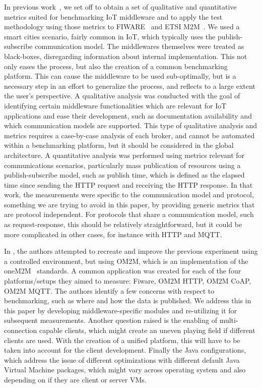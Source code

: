 \documentclass[conference]{IEEEtran}
\begin{document}
In previous work~\cite{cardoso_benchmarking_2017}, we set off to obtain a set of qualitative and quantitative metrics suited for benchmarking IoT middleware and to apply the test methodology using those metrics to FIWARE~\cite{FIWARE27:online} and ETSI M2M~\cite{ETSIWelc14:online}. %
We used a smart cities scenario, fairly common in IoT, which typically uses the publish-subscribe communication model. The middlewares themselves were treated as black-boxes, disregarding information about internal implementation. This not only eases the process, but also the creation of a common benchmarking platform. This can cause the middleware to be used sub-optimally, but is a necessary step in an effort to generalize the process, and reflects to a large extent the user's perspective. A qualitative analysis was conducted with the goal of identifying certain middleware functionalities which are relevant for IoT applications and ease their development, such as documentation availability and which communication models are supported. This type of qualitative analysis and metrics requires a case-by-case analysis of each broker, and cannot be automated within a benchmarking platform, but it should be considered in the global architecture. A quantitative analysis was performed using metrics relevant for communications scenarios, particularly mass publication of resources using a publish-subscribe model, such as publish time, which is defined as the elapsed time since sending the HTTP request and receiving the HTTP response. In that work, the measurements were specific to the communication model and protocol, something we are trying to avoid in this paper, by providing generic metrics that are protocol independent. For protocols that share a communication model, such as request-response, this should be relatively straightforward, but it could be more complicated in other cases, for instance with HTTP and MQTT\@.

In \cite{pereira_benchmarking_2018}, the authors attempted to recreate and improve the previous experiment using a controlled environment, but using OM2M, which is an implementation of the oneM2M~\cite{oneM2MHo30:online} standards. A common application was created for each of the four platforms\slash setups they aimed to measure: Fiware, OM2M HTTP, OM2M CoAP, OM2M MQTT. The authors identify a few concerns with respect to benchmarking, such as where and how the data is published. %
We address this in this paper by developing middleware-specific modules and re-utilizing it for subsequent measurements. Another question raised is the enabling of multi-connection capable clients, which might create an uneven playing field if different clients are used. With the creation of a unified platform, this will have to be taken into account for the client development. Finally the Java configurations, which address the issue of different optimizations with different default Java Virtual Machine packages, which might vary across operating system and also depending on if they are client or server VMs.
\end{document}
